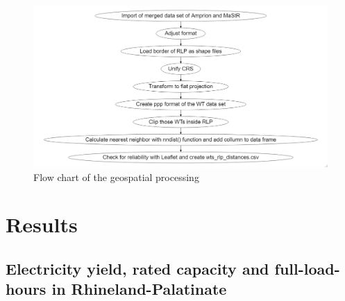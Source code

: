\documentclass[a4paper,11pt]{article}
\begin{document}
\begin{figure}[H]

{\centering \includegraphics[width=1\linewidth]{figures/flowchart_nearest} 

}

\caption{Flow chart of the geospatial processing}\label{fig:nearest}
\end{figure}
\newpage

\hypertarget{results}{%
\section{Results}\label{results}}

\hypertarget{electricity-yield-rated-capacity-and-full-load-hours-in-rhineland-palatinate}{%
\subsection{Electricity yield, rated capacity and full-load-hours in Rhineland-Palatinate}\label{electricity-yield-rated-capacity-and-full-load-hours-in-rhineland-palatinate}}
\end{document}
